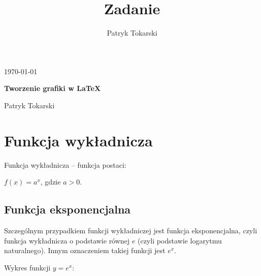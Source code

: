 \documentclass[10pt,a4paper,onecolumn]{article}
\author{Patryk Tokarski}
\title{Zadanie }
\begin{document}
\begin{titlepage}
	\hfill \today

	\vspace{.2\textheight}

	\begin{center}
		{\LARGE\bfseries Tworzenie grafiki w LaTeX\par}
		\vspace{3cm}
		Patryk Tokarski \par
	\end{center}
	\vfill\centering  \par
\end{titlepage}

\section{Funkcja wykładnicza}
Funkcja wykładnicza – funkcja postaci:

    $f(x)=a^{x}$, gdzie $a>0$.


\subsection{Funkcja eksponencjalna\cite{Wykladnicza}}
Szczególnym przypadkiem funkcji wykładniczej jest funkcja eksponencjalna, czyli funkcja wykładnicza o podstawie równej $e$ (czyli podstawie logarytmu naturalnego). Innym oznaczeniem takiej funkcji jest $e^x$.

Wykres funkcji $y=e^{x}{:}$
\end{document}
